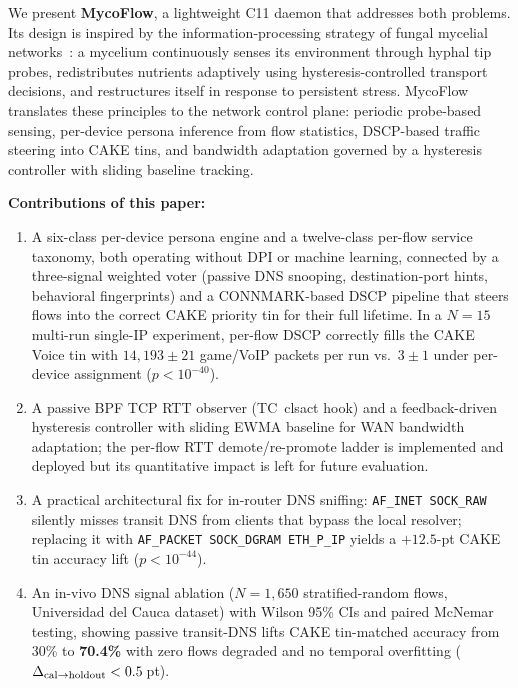 \documentclass[conference]{IEEEtran}
\begin{document}
We present \textbf{MycoFlow}, a lightweight C11 daemon that addresses both
problems.
Its design is inspired by the information-processing strategy of fungal
mycelial networks~\cite{fricker2017mycelium}: a mycelium continuously senses
its environment through hyphal tip probes, redistributes nutrients adaptively
using hysteresis-controlled transport decisions, and restructures itself in
response to persistent stress.
MycoFlow translates these principles to the network control plane: periodic
probe-based sensing, per-device persona inference from flow statistics,
DSCP-based traffic steering into CAKE tins, and bandwidth adaptation governed
by a hysteresis controller with sliding baseline tracking.

\textbf{Contributions of this paper:}
\begin{enumerate}
  \item A six-class per-device persona engine and a twelve-class per-flow
    service taxonomy, both operating without DPI or machine learning, connected
    by a three-signal weighted voter (passive DNS snooping, destination-port
    hints, behavioral fingerprints) and a CONNMARK-based DSCP pipeline that
    steers flows into the correct CAKE priority tin for their full lifetime.
    In a $N{=}15$ multi-run single-IP experiment, per-flow DSCP correctly
    fills the CAKE Voice tin with $14{,}193 \pm 21$ game/VoIP packets per run
    vs.\ $3 \pm 1$ under per-device assignment ($p < 10^{-40}$).
  \item A passive BPF TCP RTT observer (TC~clsact hook) and a feedback-driven
    hysteresis controller with sliding EWMA baseline for WAN bandwidth
    adaptation; the per-flow RTT demote/re-promote ladder is implemented and
    deployed but its quantitative impact is left for future evaluation.
  \item A practical architectural fix for in-router DNS sniffing:
    \texttt{AF\_INET SOCK\_RAW} silently misses transit DNS from clients
    that bypass the local resolver; replacing it with
    \texttt{AF\_PACKET SOCK\_DGRAM ETH\_P\_IP} yields a $+12.5$-pt
    CAKE tin accuracy lift ($p < 10^{-44}$).
  \item An in-vivo DNS signal ablation ($N=1{,}650$ stratified-random flows,
    Universidad del Cauca dataset) with Wilson 95\% CIs and paired McNemar
    testing, showing passive transit-DNS lifts CAKE tin-matched accuracy from
    30\% to \textbf{70.4\%} with zero flows degraded and no temporal
    overfitting ($\Delta_{\rm cal\to holdout} < 0.5$\,pt).
\end{enumerate}
\end{document}
